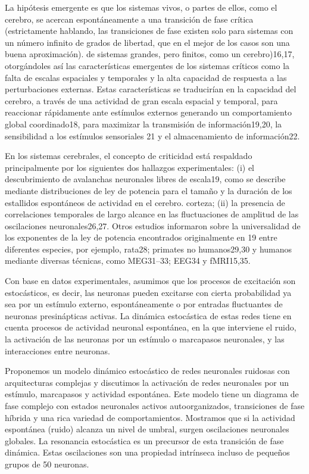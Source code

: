  
 La hipótesis emergente es que los sistemas vivos, o partes de ellos, como el cerebro, se acercan espontáneamente a una transición de fase crítica (estrictamente hablando, las transiciones de fase existen solo para sistemas con un número infinito de grados de libertad, que en el mejor de los casos son una buena aproximación). de sistemas grandes, pero finitos, como un cerebro)16,17, otorgándoles así las características emergentes de los sistemas críticos como la falta de escalas espaciales y temporales y la alta capacidad de respuesta a las perturbaciones externas. Estas características se traducirían en la capacidad del cerebro, a través de una actividad de gran escala espacial y temporal, para reaccionar rápidamente ante estímulos externos generando un comportamiento global coordinado18, para maximizar la transmisión de información19,20, la sensibilidad a los estímulos sensoriales 21 y el almacenamiento de información22.
 
 En los sistemas cerebrales, el concepto de criticidad está respaldado principalmente por los siguientes dos hallazgos experimentales: (i) el descubrimiento de avalanchas neuronales libres de escala19, como se describe mediante distribuciones de ley de potencia para el tamaño y la duración de los estallidos espontáneos de actividad en el cerebro. corteza; (ii) la presencia de correlaciones temporales de largo alcance en las fluctuaciones de amplitud de las oscilaciones neuronales26,27. Otros estudios informaron sobre la universalidad de los exponentes de la ley de potencia encontrados originalmente en 19 entre diferentes especies, por ejemplo, rata28; primates no humanos29,30 y humanos mediante diversas técnicas, como MEG31–33; EEG34 y fMRI15,35.
 
 
 
 
 Con base en datos experimentales, asumimos que los procesos de excitación son estocásticos, es decir, las neuronas pueden excitarse con cierta probabilidad ya sea por un estímulo externo, espontáneamente o por entradas fluctuantes de neuronas presinápticas activas. La dinámica estocástica de estas redes tiene en cuenta procesos de actividad neuronal espontánea, en la que interviene el ruido, la activación de las neuronas por un estímulo o marcapasos neuronales, y las interacciones entre neuronas.    
 
 
 Proponemos un modelo dinámico estocástico de redes neuronales ruidosas con arquitecturas complejas y discutimos la activación de redes neuronales por un estímulo, marcapasos y actividad espontánea. Este modelo tiene un diagrama de fase complejo con estados neuronales activos autoorganizados, transiciones de fase híbrida y una rica variedad de comportamientos. Mostramos que si la actividad espontánea (ruido) alcanza un nivel de umbral, surgen oscilaciones neuronales globales. La resonancia estocástica es un precursor de esta transición de fase dinámica. Estas oscilaciones son una propiedad intrínseca incluso de pequeños grupos de 50 neuronas.

